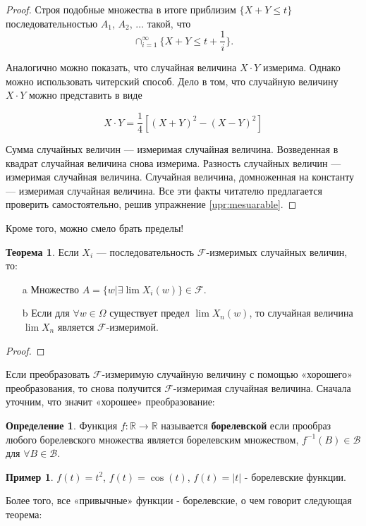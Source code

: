 \documentclass[pdftex, 12pt, a4paper]{article}
\def\R{\ensuremath{\mathbb{R}}} %
\def\F{\ensuremath{\mathcal{F}}} %
\def\B{\ensuremath{\mathcal{B}}} %
\renewcommand{\to}{\rightarrow}
\renewcommand{\le}{\leqslant}
\theoremstyle{definition} %
\newtheorem*{mydef}{Определение}
\newtheorem{myex}{Пример}
\newtheorem{myth}{Теорема}
\numberwithin{problem}{section}
\newcommand{\indef}[1]{\textbf{#1}}
\numberwithin{blits}{section}
\begin{document}
\begin{proof}
Строя подобные множества в итоге приблизим $\{X+Y \le t\}$ последовательностью $A_1$, $A_2$, $\ldots$ такой, что \[\cap_{i=1}^{\infty} \{X+Y \le t + \frac{1}{i} \}.\]

Аналогично можно показать, что случайная величина $X \cdot Y$ измерима. Однако можно использовать читерский способ. Дело в том, что случайную величину $X \cdot Y$ можно представить в виде 

\[X \cdot Y = \frac{1}{4} [(X+Y)^2 - (X-Y)^2] \]

Сумма случайных величин --- измеримая случайная величина. Возведенная в квадрат случайная величина снова измерима. Разность случайных величин --- измеримая случайная величина. Случайная величина, домноженная на константу --- измеримая случайная величина. Все эти факты читателю предлагается проверить самостоятельно, решив упражнение \ref{upr:mesuarable}.
\end{proof}


Кроме того, можно смело брать пределы!

\begin{myth} Если $X_{i}$ --- последовательность \F-измеримых случайных величин, то:

\begin{enumerate}
\item[a] Множество $A=\{w|\exists \lim X_{i}(w)\}\in\F$.
\item[b] Если для $\forall w\in\Omega$ существует предел $\lim X_{n}(w)$, то случайная величина $\lim X_{n}$ является \F-измеримой.
\end{enumerate}
\end{myth}
\begin{proof}
\end{proof}

Если преобразовать \F-измеримую случайную величину с помощью «хорошего» преобразования, то снова получится \F-измеримая случайная величина.
Сначала уточним, что значит «хорошее» преобразование:

\begin{mydef} Функция $f:\R\to\R$ называется \indef{борелевской}  если прообраз любого борелевского множества является борелевским множеством, $f^{-1}(B)\in\B$ для $\forall B\in \B$.
\end{mydef}

\begin{myex} $f(t)=t^{2}$, $f(t)=\cos(t)$, $f(t)=|t|$ - борелевские функции.
\end{myex}

Более того, все «привычные» функции - борелевские, о чем говорит следующая теорема:
\end{document}
